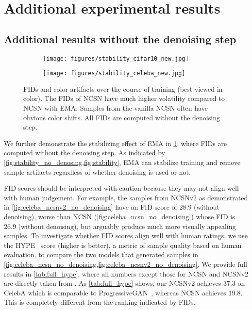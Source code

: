 \documentclass{article}
\begin{document}
\section{Additional experimental results}\label{app:exp_results}
\subsection{Additional results without the denoising step}\label{app:no_denoise_results}

\begin{figure}\centering
    \begin{subfigure}[b]{0.43\textwidth}
        \texttt{[image: figures/stability\_cifar10\_new.jpg]}
    \end{subfigure}
    \begin{subfigure}[b]{0.43\textwidth}
        \texttt{[image: figures/stability\_celeba\_new.jpg]}
    \end{subfigure}
    \caption{FIDs and color artifacts over the course of training (best viewed in color). The FIDs of NCSN have much higher volatility compared to NCSN with EMA. Samples from the vanilla NCSN often have obvious color shifts. All FIDs are computed without the denoising step.}
    \label{fig:stability_no_denosing}
\end{figure}

We further demonstrate the stabilizing effect of EMA in \cref{fig:stability_no_denosing}, where FIDs are computed without the denoising step. As indicated by \cref{fig:stability_no_denosing,fig:stability}, EMA can stabilize training and remove sample artifacts regardless of whether denoising is used or not.


FID scores should be interpreted with caution because they may not align well with human judgement. For example, the samples from NCSNv2 as demonstrated in \cref{fig:celeba_ncsnv2_no_denoising} have an FID score of 28.9 (without denoising), worse than NCSN (\cref{fig:celeba_ncsn_no_denoising}) whose FID is 26.9 (without denoising), but arguably produce much more visually appealing samples. To investigate whether FID scores align well with human ratings, we use the HYPE~\cite{zhou2019hype} score (higher is better), a metric of sample quality based on human evaluation, to compare the two models that generated samples in \cref{fig:celeba_ncsn_no_denoising,fig:celeba_ncsnv2_no_denoising}. We provide full results in \cref{tab:full_hype}, where all numbers except those for NCSN and NCSNv2 are directly taken from \cite{zhou2019hype}. As \cref{tab:full_hype} shows, our NCSNv2 achieves 37.3 on CelebA  which is comparable to ProgressiveGAN~\cite{karras2017progressive}, whereas NCSN achieves 19.8. This is completely different from the ranking indicated by FIDs.
\end{document}
